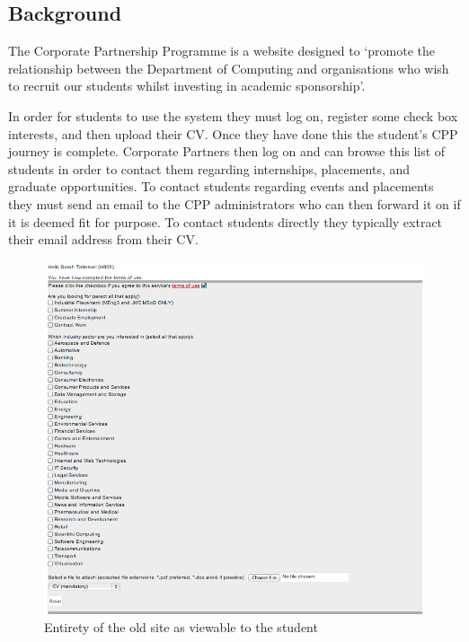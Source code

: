 \subsection{Background}
The Corporate Partnership Programme is a website designed to `promote the relationship between the Department of Computing and organisations who wish to recruit our students whilst investing in academic sponsorship'\cite{doc-cpp}.

In order for students to use the system they must log on, register some check box interests, and then upload their CV.
Once they have done this the student's CPP journey is complete.
Corporate Partners then log on and can browse this list of students in order to contact them regarding internships, placements, and graduate opportunities. To contact students regarding events and placements they must send an email to the CPP administrators who can then forward it on if it is deemed fit for purpose. To contact students directly they typically extract their email address from their CV.

\begin{figure}[H]\centering
\includegraphics[scale=0.5]{images/introduction/old_cpp}
\caption{Entirety of the old site as viewable to the student}
\end{figure}
